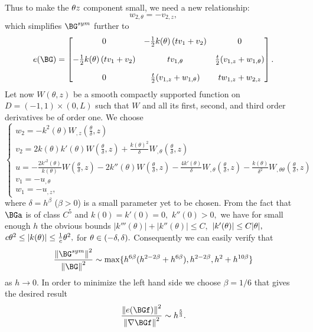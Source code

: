 Thus to make the $\theta z$ component small, we need a new relationship:
\begin{equation}
\label{4.51}
w_{2,\theta}=-v_{2,z},
\end{equation}
which simplifies $\BG^{sym}$ further to
\begin{equation}
\label{4.52}
e(\BG)=
\begin{bmatrix} 
0       &      -\frac{1}{2}k(\theta)\left(tv_1+v_2\right)    &    0 \\[10pt]
-\frac{1}{2}k(\theta)\left(tv_1+v_2\right)    &     tv_{1,\theta}    &      \frac{t}{2}(v_{1,z}+w_{1,\theta})\\[10pt]
0      &    \frac{t}{2}(v_{1,z}+w_{1,\theta})    &      tw_{1,z}+w_{2,z}
\end{bmatrix}.
\end{equation}
Let now $W(\theta,z)$ be a smooth compactly supported function on $D=(-1,1)\times(0,L)$ such that $W$ and all its first, second, and third order derivatives be of order one. 
We choose 
\begin{equation}
\label{4.53}
\begin{cases}
w_2=-k^2(\theta)W_{,z}(\frac{\theta}{\delta},z)\\[5pt]
v_2=2k(\theta)k'(\theta)W(\frac{\theta}{\delta},z)+\frac{k(\theta)^2}{\delta}W_{,\theta}(\frac{\theta}{\delta},z)\\[5pt]
u=-\frac{2k'^2(\theta)}{k(\theta)}W(\frac{\theta}{\delta},z)-2k''(\theta)W(\frac{\theta}{\delta},z)-\frac{4k'(\theta)}{\delta}W_{,\theta}(\frac{\theta}{\delta},z)-\frac{k(\theta)}{\delta^2}W_{,\theta\theta}(\frac{\theta}{\delta},z)\\[5pt]
v_1=-u_{,\theta}\\[5pt]
w_1=-u_{,z},
\end{cases}
\end{equation}
where $\delta=h^\beta$ ($\beta>0$) is a small parameter yet to be chosen. From the fact that $\BGa$ is of class $C^5$ and $k(0)=k'(0)=0,$ $k''(0)>0,$ we have for small enough $h$ the obvious bounds $|k'''(\theta)|+|k''(\theta)|\leq C,$ $|k'(\theta)|\leq C|\theta|,$ $c\theta^2\leq |k(\theta)|\leq \frac{1}{c}\theta^2,$ for $\theta\in (-\delta,\delta).$
Consequently we can easily verify that
$$
\frac{\norm{\BG^{sym}}^2}{\norm{\BG}^2}\sim \max\{h^{6\beta}(h^{2-2\beta}+h^{6\beta}),h^{2-2\beta},h^2+h^{10\beta}\}
$$
as $h\to 0.$ In order to minimize the left hand side we choose $\beta=1/6$ that gives the desired result
$$\frac{\norm{e(\BGf)}^2}{\norm{\nabla\BGf}^2}\sim h^{\frac{5}{3}}.$$ 







